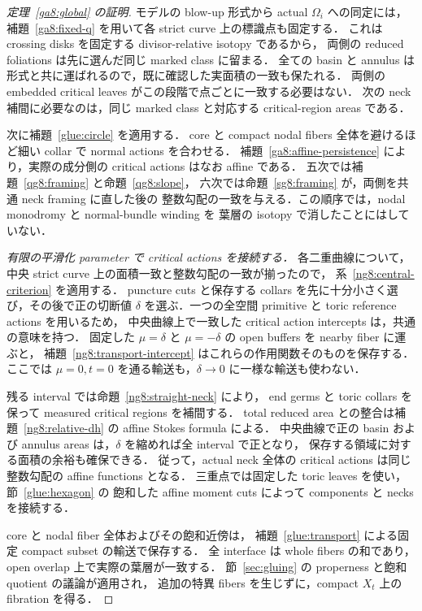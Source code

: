 \begin{proof}[定理~\ref{ga8:global} の証明]
モデルの blow-up 形式から actual $\Omega_i$ への同定には，
補題~\ref{ga8:fixed-q} を用いて各 strict curve 上の標識点も固定する．
これは crossing disks を固定する divisor-relative isotopy であるから，
両側の reduced foliations は先に選んだ同じ marked class に留まる．
全ての basin と annulus は形式と共に運ばれるので，既に確認した実面積の一致も保たれる．
両側の embedded critical leaves がこの段階で点ごとに一致する必要はない．
次の neck 補間に必要なのは，同じ marked class と対応する critical-region areas である．

次に補題~\ref{glue:circle} を適用する．
core と compact nodal fibers 全体を避けるほど細い collar で normal actions を合わせる．
補題~\ref{ga8:affine-persistence} により，実際の成分側の critical actions はなお affine である．
五次では補題~\ref{qg8:framing} と命題~\ref{qg8:slope}，
六次では命題~\ref{sg8:framing} が，両側を共通 neck framing に直した後の
整数勾配の一致を与える．この順序では，nodal monodromy と normal-bundle winding を
葉層の isotopy で消したことにはしていない．

\textit{有限の平滑化 parameter で critical actions を接続する．}
各二重曲線について，中央 strict curve 上の面積一致と整数勾配の一致が揃ったので，
系~\ref{ng8:central-criterion} を適用する．
puncture cuts と保存する collars を先に十分小さく選び，その後で正の切断値
$\delta$ を選ぶ．一つの全空間 primitive と toric reference actions を用いるため，
中央曲線上で一致した critical action intercepts は，共通の意味を持つ．
固定した $\mu=\delta$ と $\mu=-\delta$ の open buffers を nearby fiber に運ぶと，
補題~\ref{ng8:transport-intercept} はこれらの作用関数そのものを保存する．
ここでは $\mu=0,t=0$ を通る輸送も，$\delta\to0$ に一様な輸送も使わない．

残る interval では命題~\ref{ng8:straight-neck} により，
end germs と toric collars を保って measured critical regions を補間する．
total reduced area との整合は補題~\ref{ng8:relative-dh} の affine Stokes formula による．
中央曲線で正の basin および annulus areas は，$\delta$ を縮めれば全 interval で正となり，
保存する領域に対する面積の余裕も確保できる．
従って，actual neck 全体の critical actions は同じ整数勾配の affine functions となる．
三重点では固定した toric leaves を使い，節~\ref{glue:hexagon} の
飽和した affine moment cuts によって components と necks を接続する．

core と nodal fiber 全体およびその飽和近傍は，
補題~\ref{glue:transport} による固定 compact subset の輸送で保存する．
全 interface は whole fibers の和であり，open overlap 上で実際の葉層が一致する．
節~\ref{sec:gluing} の properness と飽和 quotient の議論が適用され，
追加の特異 fibers を生じずに，compact $X_t$ 上の fibration を得る．


\end{proof}
